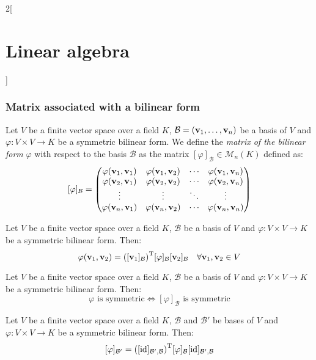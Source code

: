 \documentclass[../../../main_math.tex]{subfiles}
\begin{document}
\begin{multicols}{2}[\section{Linear algebra}]
  \subsubsection{Matrix associated with a bilinear form}
  \begin{definition}
    Let $V$ be a finite vector space over a field $K$, $\mathcal{B}=(\boldsymbol{\mathrm{v}}_1,\ldots,\boldsymbol{\mathrm{v}}_n)$ be a basis of $V$ and $\varphi:V\times V\rightarrow K$ be a symmetric bilinear form. We define the \emph{matrix of the bilinear form} $\varphi$ with respect to the basis $\mathcal{B}$ as the matrix $[\varphi]_\mathcal{B}\in\mathcal{M}_n(K)$ defined as: $$[\varphi]_\mathcal{B}=
      \begin{pmatrix}
        \varphi(\boldsymbol{\mathrm{v}}_1,\boldsymbol{\mathrm{v}}_1) & \varphi(\boldsymbol{\mathrm{v}}_1,\boldsymbol{\mathrm{v}}_2) & \cdots & \varphi(\boldsymbol{\mathrm{v}}_1,\boldsymbol{\mathrm{v}}_n) \\
        \varphi(\boldsymbol{\mathrm{v}}_2,\boldsymbol{\mathrm{v}}_1) & \varphi(\boldsymbol{\mathrm{v}}_2,\boldsymbol{\mathrm{v}}_2) & \cdots & \varphi(\boldsymbol{\mathrm{v}}_2,\boldsymbol{\mathrm{v}}_n) \\
        \vdots                     & \vdots                     & \ddots & \vdots                     \\
        \varphi(\boldsymbol{\mathrm{v}}_n,\boldsymbol{\mathrm{v}}_1) & \varphi(\boldsymbol{\mathrm{v}}_n,\boldsymbol{\mathrm{v}}_2) & \cdots & \varphi(\boldsymbol{\mathrm{v}}_n,\boldsymbol{\mathrm{v}}_n) \\
      \end{pmatrix}$$
  \end{definition}
  \begin{lemma}
    Let $V$ be a finite vector space over a field $K$, $\mathcal{B}$ be a basis of $V$ and $\varphi:V\times V\rightarrow K$ be a symmetric bilinear form. Then:
    $$\varphi(\boldsymbol{\mathrm{v}}_1,\boldsymbol{\mathrm{v}}_2)={\left([\boldsymbol{\mathrm{v}}_1]_\mathcal{B}\right)}^\mathrm{T}[\varphi]_\mathcal{B}[\boldsymbol{\mathrm{v}}_2]_\mathcal{B}\quad\forall\boldsymbol{\mathrm{v}}_1,\boldsymbol{\mathrm{v}}_2\in V$$
  \end{lemma}
  \begin{proposition}
    Let $V$ be a finite vector space over a field $K$, $\mathcal{B}$ be a basis of $V$ and $\varphi:V\times V\rightarrow K$ be a symmetric bilinear form. Then: $$\varphi\text{ is symmetric}\iff[\varphi]_\mathcal{B}\text{ is symmetric}$$
  \end{proposition}
  \begin{proposition}
    Let $V$ be a finite vector space over a field $K$, $\mathcal{B}$ and $\mathcal{B}'$ be bases of $V$ and $\varphi:V\times V\rightarrow K$ be a symmetric bilinear form. Then: $$[\varphi]_{\mathcal{B}'}={([\mathrm{id}]_{\mathcal{B}',\mathcal{B}})}^\mathrm{T}[\varphi]_\mathcal{B}[\mathrm{id}]_{\mathcal{B}',\mathcal{B}}$$
  \end{proposition}

\end{multicols}
\end{document}
